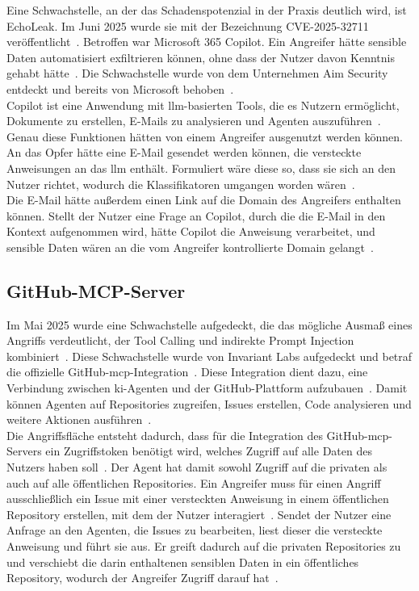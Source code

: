 Eine Schwachstelle, an der das Schadenspotenzial in der Praxis deutlich wird, ist \glqq EchoLeak\grqq. Im Juni 2025 wurde sie mit der Bezeichnung 
CVE-2025-32711 veröffentlicht~\cite{e07}. Betroffen war Microsoft 365 Copilot. Ein Angreifer hätte sensible Daten automatisiert exfiltrieren können, ohne dass der 
Nutzer davon Kenntnis gehabt hätte~\cite{e06}. Die Schwachstelle wurde von dem Unternehmen Aim Security entdeckt und bereits von Microsoft behoben~\cite{e06}. \\
Copilot ist eine Anwendung mit \ac{llm}-basierten Tools, die es Nutzern ermöglicht, Dokumente zu erstellen, E-Mails zu analysieren und Agenten auszuführen~\cite{e06}.
Genau diese Funktionen hätten von einem Angreifer ausgenutzt werden können. An das Opfer hätte eine E-Mail gesendet werden können, die versteckte Anweisungen an das \ac{llm}
enthält. Formuliert wäre diese so, dass sie sich an den Nutzer richtet, wodurch die Klassifikatoren umgangen worden wären~\cite{e06}. \\
Die E-Mail hätte außerdem einen Link auf die Domain des Angreifers enthalten können. Stellt der Nutzer eine Frage an Copilot, durch die die E-Mail in den Kontext
aufgenommen wird, hätte Copilot die Anweisung verarbeitet, und sensible Daten wären an die vom Angreifer kontrollierte Domain gelangt~\cite{e06}.

\subsection{GitHub-MCP-Server}\label{subsec:github_mcp}

Im Mai 2025 wurde eine Schwachstelle aufgedeckt, die das mögliche Ausmaß eines Angriffs verdeutlicht, der Tool Calling und indirekte Prompt Injection 
kombiniert~\cite{pi34}. Diese Schwachstelle wurde von Invariant Labs aufgedeckt und betraf die offizielle GitHub-\ac{mcp}-Integration~\cite{pi36}. 
Diese Integration dient dazu, eine Verbindung zwischen \ac{ki}-Agenten und der GitHub-Plattform aufzubauen~\cite{pi35}. Damit können Agenten auf Repositories 
zugreifen, Issues erstellen, Code analysieren und weitere Aktionen ausführen~\cite{pi35}. \\
Die Angriffsfläche entsteht dadurch, dass für die Integration des GitHub-\ac{mcp}-Servers ein Zugriffstoken benötigt wird, welches Zugriff auf alle Daten des Nutzers 
haben soll~\cite{pi34}. Der Agent hat damit sowohl Zugriff auf die privaten als auch auf alle öffentlichen Repositories. Ein Angreifer muss für einen Angriff 
ausschließlich ein Issue mit einer versteckten Anweisung in einem öffentlichen Repository erstellen, mit dem der Nutzer interagiert~\cite{pi34}. Sendet der Nutzer
eine Anfrage an den Agenten, die Issues zu bearbeiten, liest dieser die versteckte Anweisung und führt sie aus. Er greift dadurch auf die privaten Repositories zu 
und verschiebt die darin enthaltenen sensiblen Daten in ein öffentliches Repository, wodurch der Angreifer Zugriff darauf hat~\cite{pi34}. 

